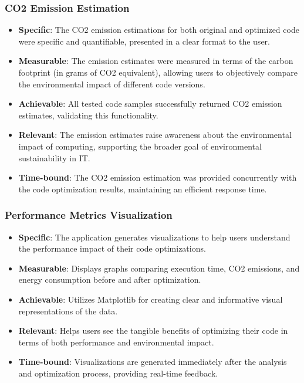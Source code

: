 \documentclass[conference,compsoc]{IEEEtran}
\begin{document}
\subsubsection{CO2 Emission Estimation}
\begin{itemize}
	\item \textbf{Specific}: The CO2 emission estimations for both original and optimized code were specific and quantifiable, presented in a clear format to the user.

	\item \textbf{Measurable}: The emission estimates were measured in terms of the carbon footprint (in grams of CO2 equivalent), allowing users to objectively compare the environmental impact of different code versions.

	\item \textbf{Achievable}: All tested code samples successfully returned CO2 emission estimates, validating this functionality.

	\item \textbf{Relevant}: The emission estimates raise awareness about the environmental impact of computing, supporting the broader goal of environmental sustainability in IT.

	\item \textbf{Time-bound}: The CO2 emission estimation was provided concurrently with the code optimization results, maintaining an efficient response time.
\end{itemize}

\subsubsection{Performance Metrics Visualization}
\begin{itemize}
	\item \textbf{Specific}: The application generates visualizations to help users understand the performance impact of their code optimizations.

	\item \textbf{Measurable}: Displays graphs comparing execution time, CO2 emissions, and energy consumption before and after optimization.

	\item \textbf{Achievable}: Utilizes Matplotlib for creating clear and informative visual representations of the data.

	\item \textbf{Relevant}: Helps users see the tangible benefits of optimizing their code in terms of both performance and environmental impact.

	\item \textbf{Time-bound}: Visualizations are generated immediately after the analysis and optimization process, providing real-time feedback.
\end{itemize}
\end{document}
